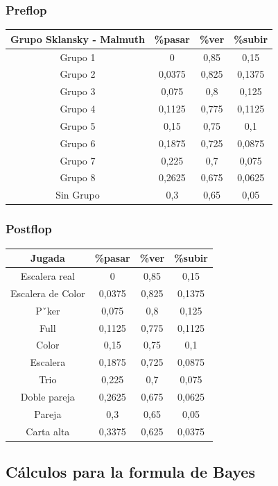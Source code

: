 \subsubsection{Preflop}
\begin{longtable}[c]{|c|c|c|c|}
\hline
\rowcolor{lightgray}Grupo Sklansky - Malmuth & \%pasar & \%ver & \%subir \\ \hline
Grupo 1 & 0 & 0,85 & 0,15 \\ \hline
Grupo 2 & 0,0375 & 0,825 & 0,1375 \\ \hline
Grupo 3 & 0,075 & 0,8 & 0,125 \\ \hline
Grupo 4 & 0,1125 & 0,775 & 0,1125 \\ \hline
Grupo 5 & 0,15 & 0,75 & 0,1 \\ \hline
Grupo 6 & 0,1875 & 0,725 & 0,0875 \\ \hline
Grupo 7 & 0,225 & 0,7 & 0,075 \\ \hline
Grupo 8 & 0,2625 & 0,675 & 0,0625 \\ \hline
Sin Grupo & 0,3 & 0,65 & 0,05 \\ \hline

\end{longtable}
\subsubsection{Postflop}

\begin{longtable}[c]{|c|c|c|c|}
\hline
\rowcolor{lightgray}Jugada & \%pasar & \%ver & \%subir \\ \hline
Escalera real & 0 & 0,85 & 0,15 \\ \hline
Escalera de Color & 0,0375 & 0,825 & 0,1375 \\ \hline
Pˇker & 0,075 & 0,8 & 0,125 \\ \hline
Full & 0,1125 & 0,775 & 0,1125 \\ \hline
Color & 0,15 & 0,75 & 0,1 \\ \hline
Escalera & 0,1875 & 0,725 & 0,0875 \\ \hline
Trio & 0,225 & 0,7 & 0,075 \\ \hline
Doble pareja & 0,2625 & 0,675 & 0,0625 \\ \hline
Pareja & 0,3 & 0,65 & 0,05 \\ \hline
Carta alta & 0,3375 & 0,625 & 0,0375 \\ \hline
\end{longtable}

\subsection{Cálculos para la formula de Bayes}
\label{sec:calcbayes}

